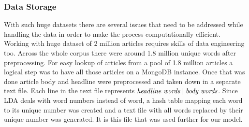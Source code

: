 \documentclass[a4paper]{article}
\begin{document}
\subsubsection{Data Storage}
With such huge datasets there are several issues that need to be addressed while handling the data in order to make the process computationally efficient. Working with huge dataset of 2 million articles requires skills of data engineering too. Across  the whole corpus there were around 1.8 million unique words after preprocessing. For easy lookup of articles from a pool of 1.8 million articles a logical step was to have all those articles on a MongoDB instance. Once that was done article body and headline were preprocessed and taken down in a separate text file. Each line in the text file represents $\emph{headline words} \mid \emph{body words}$. Since LDA deals with word numbers instead of word, a hash table mapping each word to its unique number was created and a text file with all words replaced by their unique number was generated. It is this file that was used further for our model. 
\end{document}

